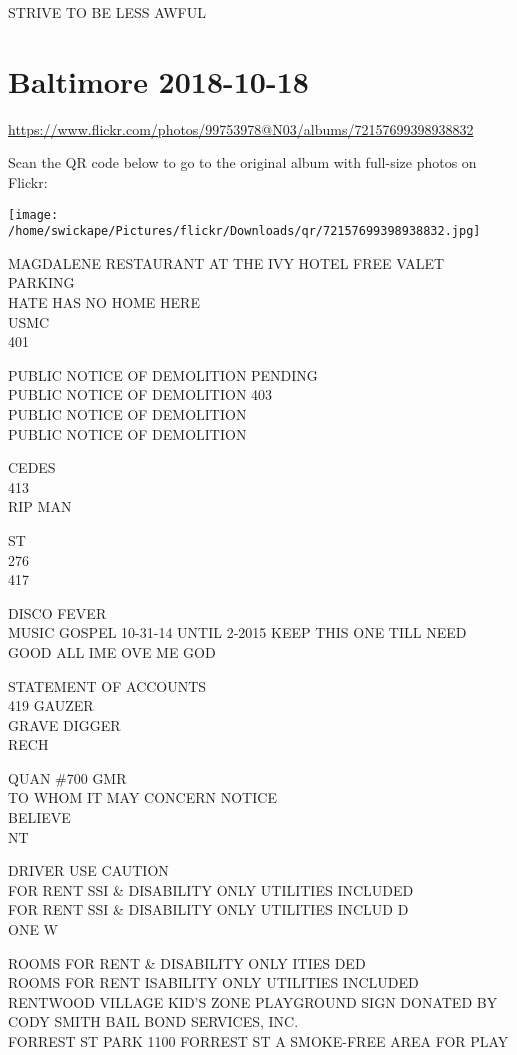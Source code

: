 \documentclass[10pt,letterpaper]{article}
\begin{document}
STRIVE TO BE LESS AWFUL
\pagebreak

\section*{Baltimore 2018-10-18}

\url{https://www.flickr.com/photos/99753978@N03/albums/72157699398938832}

Scan the QR code below to go to the original album with full-size photos on Flickr:

\texttt{[image: /home/swickape/Pictures/flickr/Downloads/qr/72157699398938832.jpg]}
\pagebreak

MAGDALENE RESTAURANT AT THE IVY HOTEL FREE VALET PARKING\\
HATE HAS NO HOME HERE\\
USMC\\
401

PUBLIC NOTICE OF DEMOLITION PENDING\\
PUBLIC NOTICE OF DEMOLITION 403\\
PUBLIC NOTICE OF DEMOLITION\\
PUBLIC NOTICE OF DEMOLITION

CEDES\\
413\\
RIP MAN

ST\\
276\\
417

DISCO FEVER\\
MUSIC GOSPEL 10{-}31{-}14 UNTIL 2{-}2015 KEEP THIS ONE TILL NEED GOOD ALL IME OVE ME GOD

STATEMENT OF ACCOUNTS\\
419 GAUZER\\
GRAVE DIGGER\\
RECH

QUAN \#700 GMR\\
TO WHOM IT MAY CONCERN NOTICE\\
BELIEVE\\
NT

DRIVER USE CAUTION\\
FOR RENT SSI \& DISABILITY ONLY UTILITIES INCLUDED\\
FOR RENT SSI \& DISABILITY ONLY UTILITIES INCLUD D\\
ONE W

ROOMS FOR RENT \& DISABILITY ONLY ITIES DED\\
ROOMS FOR RENT ISABILITY ONLY UTILITIES INCLUDED\\
RENTWOOD VILLAGE KID'S ZONE PLAYGROUND SIGN DONATED BY CODY SMITH BAIL BOND SERVICES, INC.\\
FORREST ST PARK 1100 FORREST ST A SMOKE{-}FREE AREA FOR PLAY
\end{document}
